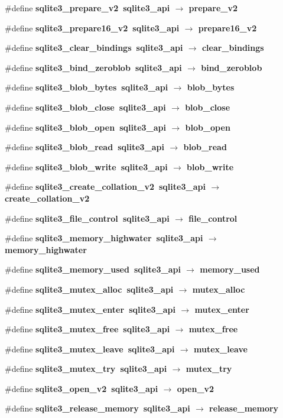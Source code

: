 \begin{CompactItemize}
\item 
\#define \bf{sqlite3\_\-prepare\_\-v2}~sqlite3\_\-api $\rightarrow$ prepare\_\-v2
\item 
\#define \bf{sqlite3\_\-prepare16\_\-v2}~sqlite3\_\-api $\rightarrow$ prepare16\_\-v2
\item 
\#define \bf{sqlite3\_\-clear\_\-bindings}~sqlite3\_\-api $\rightarrow$ clear\_\-bindings
\item 
\#define \bf{sqlite3\_\-bind\_\-zeroblob}~sqlite3\_\-api $\rightarrow$ bind\_\-zeroblob
\item 
\#define \bf{sqlite3\_\-blob\_\-bytes}~sqlite3\_\-api $\rightarrow$ blob\_\-bytes
\item 
\#define \bf{sqlite3\_\-blob\_\-close}~sqlite3\_\-api $\rightarrow$ blob\_\-close
\item 
\#define \bf{sqlite3\_\-blob\_\-open}~sqlite3\_\-api $\rightarrow$ blob\_\-open
\item 
\#define \bf{sqlite3\_\-blob\_\-read}~sqlite3\_\-api $\rightarrow$ blob\_\-read
\item 
\#define \bf{sqlite3\_\-blob\_\-write}~sqlite3\_\-api $\rightarrow$ blob\_\-write
\item 
\#define \bf{sqlite3\_\-create\_\-collation\_\-v2}~sqlite3\_\-api $\rightarrow$ create\_\-collation\_\-v2
\item 
\#define \bf{sqlite3\_\-file\_\-control}~sqlite3\_\-api $\rightarrow$ file\_\-control
\item 
\#define \bf{sqlite3\_\-memory\_\-highwater}~sqlite3\_\-api $\rightarrow$ memory\_\-highwater
\item 
\#define \bf{sqlite3\_\-memory\_\-used}~sqlite3\_\-api $\rightarrow$ memory\_\-used
\item 
\#define \bf{sqlite3\_\-mutex\_\-alloc}~sqlite3\_\-api $\rightarrow$ mutex\_\-alloc
\item 
\#define \bf{sqlite3\_\-mutex\_\-enter}~sqlite3\_\-api $\rightarrow$ mutex\_\-enter
\item 
\#define \bf{sqlite3\_\-mutex\_\-free}~sqlite3\_\-api $\rightarrow$ mutex\_\-free
\item 
\#define \bf{sqlite3\_\-mutex\_\-leave}~sqlite3\_\-api $\rightarrow$ mutex\_\-leave
\item 
\#define \bf{sqlite3\_\-mutex\_\-try}~sqlite3\_\-api $\rightarrow$ mutex\_\-try
\item 
\#define \bf{sqlite3\_\-open\_\-v2}~sqlite3\_\-api $\rightarrow$ open\_\-v2
\item 
\#define \bf{sqlite3\_\-release\_\-memory}~sqlite3\_\-api $\rightarrow$ release\_\-memory

\end{CompactItemize}
